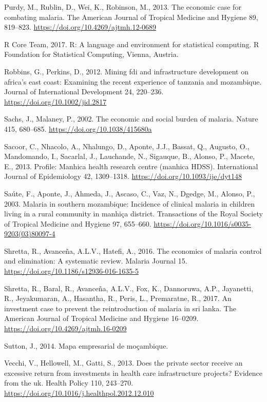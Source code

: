 \documentclass[]{article}
\begin{document}
\hypertarget{ref-Purdy_2013}{}
Purdy, M., Rublin, D., Wei, K., Robinson, M., 2013. The economic case
for combating malaria. The American Journal of Tropical Medicine and
Hygiene 89, 819--823. \url{https://doi.org/10.4269/ajtmh.12-0689}

\hypertarget{ref-R}{}
R Core Team, 2017. R: A language and environment for statistical
computing. R Foundation for Statistical Computing, Vienna, Austria.

\hypertarget{ref-Robbins2012}{}
Robbins, G., Perkins, D., 2012. Mining fdi and infrastructure
development on africa's east coast: Examining the recent experience of
tanzania and mozambique. Journal of International Development 24,
220--236. \url{https://doi.org/10.1002/jid.2817}

\hypertarget{ref-Sachs2002}{}
Sachs, J., Malaney, P., 2002. The economic and social burden of malaria.
Nature 415, 680--685. \url{https://doi.org/10.1038/415680a}

\hypertarget{ref-Sacoor2013}{}
Sacoor, C., Nhacolo, A., Nhalungo, D., Aponte, J.J., Bassat, Q.,
Augusto, O., Mandomando, I., Sacarlal, J., Lauchande, N., Sigauque, B.,
Alonso, P., Macete, E., 2013. Profile: Manhica health research centre
(manhica HDSS). International Journal of Epidemiology 42, 1309--1318.
\url{https://doi.org/10.1093/ije/dyt148}

\hypertarget{ref-Sate2003}{}
Saúte, F., Aponte, J., Ahmeda, J., Ascaso, C., Vaz, N., Dgedge, M.,
Alonso, P., 2003. Malaria in southern mozambique: Incidence of clinical
malaria in children living in a rural community in manhiça district.
Transactions of the Royal Society of Tropical Medicine and Hygiene 97,
655--660. \url{https://doi.org/10.1016/s0035-9203(03)80097-4}

\hypertarget{ref-Shretta2016}{}
Shretta, R., Avanceña, A.L.V., Hatefi, A., 2016. The economics of
malaria control and elimination: A systematic review. Malaria Journal
15. \url{https://doi.org/10.1186/s12936-016-1635-5}

\hypertarget{ref-Shretta_2017}{}
Shretta, R., Baral, R., Avanceña, A.L.V., Fox, K., Dannoruwa, A.P.,
Jayanetti, R., Jeyakumaran, A., Hasantha, R., Peris, L., Premaratne, R.,
2017. An investment case to prevent the reintroduction of malaria in sri
lanka. The American Journal of Tropical Medicine and Hygiene 16--0209.
\url{https://doi.org/10.4269/ajtmh.16-0209}

\hypertarget{ref-sutton}{}
Sutton, J., 2014. Mapa empresarial de moçambique.

\hypertarget{ref-Vecchi_2013}{}
Vecchi, V., Hellowell, M., Gatti, S., 2013. Does the private sector
receive an excessive return from investments in health care
infrastructure projects? Evidence from the uk. Health Policy 110,
243--270. \url{https://doi.org/10.1016/j.healthpol.2012.12.010}
\end{document}
